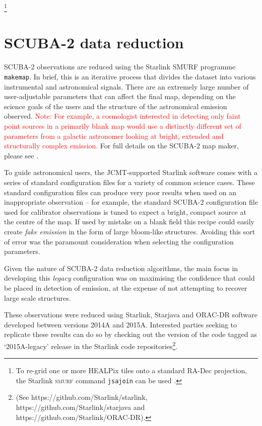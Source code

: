 \documentclass[twocolumn]{aastex6}
\newcommand{\note}[1]{\textcolor{red}{Note: #1}}
\newcommand{\ascl}[1]{\href{http://www.ascl.net/#1}{ascl:#1}}
\begin{document}
\footnote{To re-grid one or more HEALPix tiles onto a standard RA-Dec
  projection, the Starlink \textsc{smurf} command \texttt{jsajoin} can
  be used \citep[][\ascl{1310.007}]{SUN258}.}

\section{SCUBA-2 data reduction}
SCUBA-2 observations are reduced using the Starlink SMURF programme
\texttt{makemap}. In brief, this is an iterative process that divides
the dataset into various instrumental and astronomical signals. There
are an extremely large number of user-adjustable parameters that can
affect the final map, depending on the science goals of the users and
the structure of the astronomical emission observed. \note{For example, a
cosmologist interested in detecting only faint point sources in a
primarily blank map would use a distinctly different set of parameters
from a galactic astronomer looking at bright, extended and
structurally complex emission.} For full details on the SCUBA-2 map
maker, please see \citet{Chapin2013}.


To guide astronomical users, the JCMT-supported Starlink software
comes with a series of standard configuration files for a variety of
common science cases.
These standard configuration files can produce very poor results when
used on an inappropriate observation -- for example, the standard
SCUBA-2 configuration file used for calibrator observations is tuned
to expect a bright, compact source at the centre of the map. If used
by mistake on a blank field this recipe could easily create \emph{fake
  emission} in the form of large bloom-like structures. Avoiding this
sort of error was the paramount consideration when selecting the
configuration parameters.

Given the nature of SCUBA-2 data reduction algorithms, the main focus
in developing this \emph{legacy} configuration was on maximising the
confidence that could be placed in detection of emission, at the
expense of not attempting to recover large scale structures.

These observations were reduced using Starlink, Starjava and ORAC-DR
software developed between versions 2014A and 2015A. Interested
parties seeking to replicate these results can do so by checking out
the version of the code tagged as `2015A-legacy' release in the
Starlink code repositories\footnote{(See
  https://github.com/Starlink/starlink,
  https://github.com/Starlink/starjava and
  https://github.com/Starlink/ORAC-DR).}.
\end{document}
